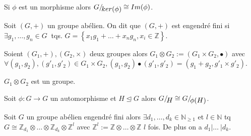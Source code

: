      \begin{theorem}
    Si $\phi$ est un morphisme alors $G/\!\raisebox{-.65ex}{\ensuremath{{ker(\phi)}}} \cong Im(\phi)$.
     \end{theorem}
     
         \begin{definition}
    \label{def:49}
    Soit $(G,+)$ un groupe abélien. On dit que $(G,+)$ est engendré fini si $\exists g_1,\dots,g_n \in G\ $ tqs. $G= \left\{ x_1g_1+\dots+x_ng_n, x_i \in \mathbb{Z} \right\} $.
        \end{definition}
        
        
          \begin{definition}
    \label{def:49}
    Soient $(G_1,+), (G_2,\times)$ deux groupes alors $G_1\otimes G_2 :=(G_1\times G_2, \bullet )$ avec $\forall (g_1,g_2), (g'_1,g'_2) \in G_1\times G_2, (g_1,g_2)\bullet (g'_1,g'_2)= (g_1+g_2, g'_1 \times g'_2)$.
    \end{definition}
    
        \begin{remark}
        \label{rem:2}
         $G_1\otimes G_2$ est un groupe.
        \end{remark}
        
        
         \begin{lemma}

    Soit $\phi:G\rightarrow G$ un automorphisme et $H\unlhd G$ alors $ G/\!\raisebox{-.65ex}{\ensuremath{{H}}} \cong G/\!\raisebox{-.65ex}{\ensuremath{{ \phi (H)}}}$.
    \end{lemma}
        
          \begin{theorem}
    Soit $G$ un groupe abélien engendré fini alors $\exists d_1,\dots,d_k \in \mathbb{N}_{ \ge 1}$ et $l\in \mathbb{N}$ tq $G  \cong \mathbb{Z}_{d_1} \otimes \dots \otimes \mathbb{Z}_{d_k} \otimes \mathbb{Z}^l$ avec $\mathbb{Z}^l:=\mathbb{Z} \otimes \dots 
   \otimes \mathbb{Z}$ $l$ fois. De plus on a $d_1|\dots\ |d_k$.
    \end{theorem}
    
